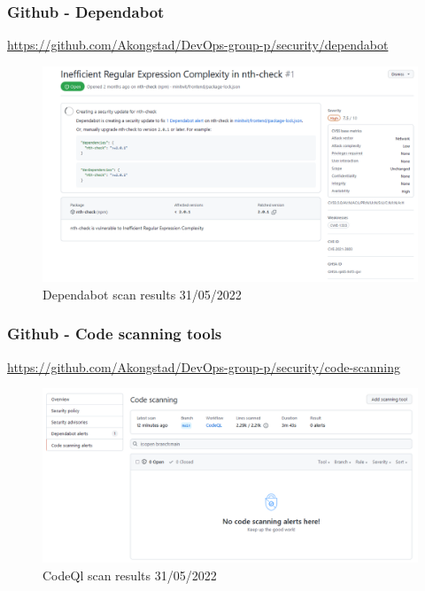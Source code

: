 \subsubsection{Github - Dependabot}
\label{app:codeAnalDependabot}
\href{https://github.com/Akongstad/DevOps-group-p/security/dependabot}{https://github.com/Akongstad/DevOps-group-p/security/dependabot}
\begin {figure}[H]
    \centering
    \includegraphics[scale=0.50]{images/analysis_tools/alertDependabot.PNG}
    \caption{Dependabot scan results 31/05/2022}
    \label{fig:dependabot}
\end{figure}

\subsubsection{Github - Code scanning tools}
\label{app:codeAnalQl}
\href{https://github.com/Akongstad/DevOps-group-p/security/code-scanning}{https://github.com/Akongstad/DevOps-group-p/security/code-scanning}
\begin {figure}[H]
    \centering
    \includegraphics[scale=0.50]{images/analysis_tools/CodeQlScan.PNG}
    \caption{CodeQl scan results 31/05/2022}
    \label{fig:codeql}
\end{figure}



